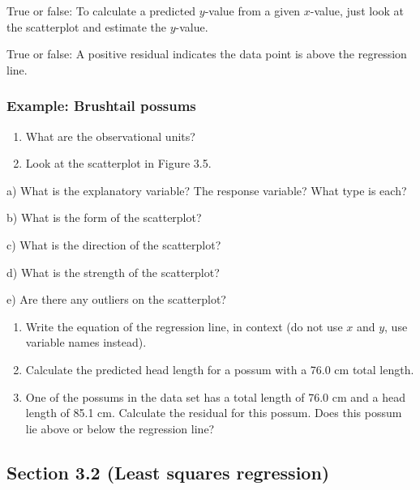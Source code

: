 \documentclass[
]{report}
\newcommand{\rgs}{\vspace{12pt}} %
\newcommand{\rgi}{\hspace{24pt}}  %
\begin{document}
True or false: To calculate a predicted \(y\)-value from a given \(x\)-value, just look at the scatterplot and estimate the \(y\)-value.

True or false: A positive residual indicates the data point is above the regression line.

\newpage

\hypertarget{example-brushtail-possums}{%
\subsubsection*{Example: Brushtail possums}\label{example-brushtail-possums}}

\begin{enumerate}
\def\labelenumi{\arabic{enumi}.}
\item
  What are the observational units?\\
  \rgs
\item
  Look at the scatterplot in Figure 3.5.
\end{enumerate}

\rgi a) What is the explanatory variable? The response variable? What type is each?
\rgs

\rgi b) What is the form of the scatterplot?
\rgs

\rgi c) What is the direction of the scatterplot?
\rgs

\rgi d) What is the strength of the scatterplot?
\rgs

\rgi e) Are there any outliers on the scatterplot?
\rgs

\begin{enumerate}
\def\labelenumi{\arabic{enumi}.}
\setcounter{enumi}{2}
\item
  Write the equation of the regression line, in context (do not use \(x\) and \(y\), use variable names instead).
  \rgs
\item
  Calculate the predicted head length for a possum with a 76.0 cm total length.
  \rgs
\item
  One of the possums in the data set has a total length of 76.0 cm and a head length of 85.1 cm. Calculate the residual for this possum. Does this possum lie above or below the regression line?
  \rgs
\end{enumerate}

\hypertarget{section-3.2-least-squares-regression}{%
\subsection*{Section 3.2 (Least squares regression)}\label{section-3.2-least-squares-regression}}
\end{document}
